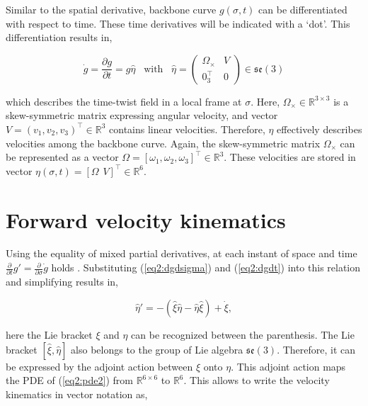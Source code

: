 Similar to the spatial derivative, backbone curve $g(\sigma,t)$ can be differentiated with respect to time. These time derivatives will be indicated with a `dot'. This differentiation results in, 

\begin{equation}
  \Dot{g} = \frac{\partial g}{\partial t} = g \hat{\eta} \hspace{10pt} \text{with} \hspace{10pt}  \hat{\eta} = \begin{pmatrix} \Omega_\times & V \\ 0_3^\top & 0 \end{pmatrix} \in  \mathfrak{se}(3)
    \label{eq2:dgdt}
\end{equation}

which describes the time-twist field in a local frame at $\sigma$. Here, $\Omega_\times \in \mathbb{R}^{3 \times 3}$ is a skew-symmetric matrix expressing angular velocity, and vector $V = (v_1,v_2,v_3)^\top \in \mathbb{R}^3$ contains linear velocities. Therefore, $\eta$ effectively describes velocities among the backbone curve. Again, the skew-symmetric matrix $\Omega_\times$ can be represented as a vector $\Omega = [\omega_1,\omega_2,\omega_3]^\top \in \mathbb{R}^3$. These velocities are stored in vector $\eta(\sigma,t) = [\Omega \hspace{5pt} V]^\top \in \mathbb{R}^6$.

\section{Forward velocity kinematics}



Using the equality of mixed partial derivatives, at each instant of space and time $\frac{\partial}{\partial t}g' = \frac{\partial}{\partial \sigma}\dot{g}$ holds \cite{Caasenbrood2020}. Substituting (\ref{eq2:dgdsigma}) and (\ref{eq2:dgdt}) into this relation and simplifying results in,

\begin{equation}
    \hat{\eta}' = -(\hat{\xi}\hat{\eta} - \hat{\eta}\hat{\xi}) + \Dot{\xi},
        \label{eq2:pde2}
\end{equation}

here the Lie bracket $\xi$ and $\eta$ can be recognized between the parenthesis. The Lie bracket $[\hat{\xi},\hat{\eta}]$ also belongs to the group of Lie algebra $\mathfrak{se}(3)$. Therefore, it can be expressed by the adjoint action between $\xi$ onto $\eta$. This adjoint action maps the PDE of (\ref{eq2:pde2}) from $\mathbb{R}^{6\times 6}$ to $\mathbb{R}^6$. This allows to write the velocity kinematics in vector notation as,

